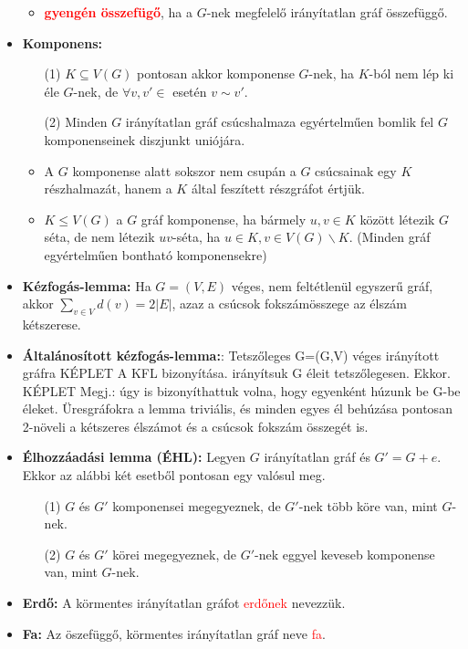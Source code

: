 \documentclass[../../szobeli.tex]{subfiles}
\begin{document}
\begin{itemize}
\begin{itemize}
            \item \textcolor{red}{\textbf{gyengén összefügő}}, ha a $G$-nek megfelelő irányítatlan gráf összefüggő.
        \end{itemize}
        \item \textbf{Komponens:} \begin{itemize}
            \item[(1)] $K \subseteq V(G)$ pontosan akkor komponense $G$-nek, ha $K$-ból nem lép ki éle $G$-nek, de $\forall v,v' \in$ esetén $v \sim v'$.
            \item[(2)] Minden $G$ irányítatlan gráf csúcshalmaza egyértelműen bomlik fel $G$ komponenseinek diszjunkt uniójára.
            \item A $G$ komponense alatt sokszor nem csupán a $G$ csúcsainak egy $K$ részhalmazát, hanem a $K$ által feszített részgráfot értjük. 
            \item $K \leq V(G)$ a $G$ gráf komponense, ha bármely $u,v \in K$ között létezik $G$ séta, de nem létezik $uv$-séta, ha $u\in K, v\in V(G)\backslash K$. (Minden gráf egyértelműen bontható komponensekre)
        \end{itemize}
        \item \textbf{Kézfogás-lemma:} Ha $G = (V,E)$ véges, nem feltétlenül egyszerű gráf, akkor $\sum_{v \in V} d(v)=2|E|$, azaz a csúcsok fokszámösszege az élszám kétszerese. 
        \item \textbf{Általánosított kézfogás-lemma:}: Tetszőleges G=(G,V) véges irányított gráfra KÉPLET  A KFL bizonyítása. irányítsuk G éleit tetszőlegesen. Ekkor. KÉPLET Megj.: úgy is bizonyíthattuk volna, hogy egyenként húzunk be G-be éleket. Üresgráfokra a lemma triviális, és minden egyes él behúzása pontosan 2-növeli a kétszeres élszámot és a csúcsok fokszám összegét is.
        \item \textbf{Élhozzáadási lemma (ÉHL):} Legyen $G$ irányítatlan gráf és $G' = G + e$. Ekkor az alábbi két esetből pontosan egy valósul meg. \begin{itemize}
            \item[(1)] $G$ és $G'$ komponensei megegyeznek, de $G'$-nek több köre van, mint $G$-nek.
            \item[(2)] $G$ és $G'$ körei megegyeznek, de $G'$-nek eggyel keveseb komponense van, mint $G$-nek. 
        \end{itemize}
        \item \textbf{Erdő:} A körmentes irányítatlan gráfot \textcolor{red}{erdőnek} nevezzük. 
        \item \textbf{Fa:} Az öszefüggő, körmentes irányítatlan gráf neve \textcolor{red}{fa}. \begin{itemize}

\end{itemize}
\end{itemize}
\end{document}
